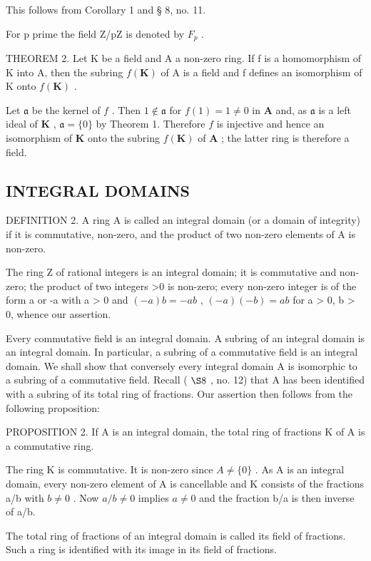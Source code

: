 This follows from Corollary 1 and § 8, no. 11.

For p prime the field Z/pZ is denoted by \(F_{p}\) .

THEOREM 2. Let K be a field and A a non-zero ring. If f is a homomorphism of K into A, then the subring \(f(\mathbf{K})\) of A is a field and f defines an isomorphism of K onto \(f(\mathbf{K})\) .

Let \(\mathfrak{a}\) be the kernel of \(f\) . Then \(1 \notin \mathfrak{a}\) for \(f(1) = 1 \neq 0\) in \(\mathbf{A}\) and, as \(\mathfrak{a}\) is a left ideal of \(\mathbf{K}\) , \(\mathfrak{a} = \{0\}\) by Theorem 1. Therefore \(f\) is injective and hence an isomorphism of \(\mathbf{K}\) onto the subring \(f(\mathbf{K})\) of \(\mathbf{A}\) ; the latter ring is therefore a field.

\subsection{INTEGRAL DOMAINS}

DEFINITION 2. A ring A is called an integral domain (or a domain of integrity) if it is commutative, non-zero, and the product of two non-zero elements of A is non-zero.

The ring Z of rational integers is an integral domain; it is commutative and non-zero; the product of two integers \textgreater0 is non-zero; every non-zero integer is of the form a or -a with a \textgreater{} 0 and \((-a)b = -ab\) , \((-a)(-b) = ab\) for a \textgreater{} 0, b \textgreater{} 0, whence our assertion.

Every commutative field is an integral domain. A subring of an integral domain is an integral domain. In particular, a subring of a commutative field is an integral domain. We shall show that conversely every integral domain A is isomorphic to a subring of a commutative field. Recall ( \(\S 8\) , no. 12) that A has been identified with a subring of its total ring of fractions. Our assertion then follows from the following proposition:

PROPOSITION 2. If A is an integral domain, the total ring of fractions K of A is a commutative ring.

The ring K is commutative. It is non-zero since \(A \neq \{0\}\) . As A is an integral domain, every non-zero element of A is cancellable and K consists of the fractions a/b with \(b \neq 0\) . Now \(a/b \neq 0\) implies \(a \neq 0\) and the fraction b/a is then inverse of a/b.

The total ring of fractions of an integral domain is called its field of fractions. Such a ring is identified with its image in its field of fractions.

